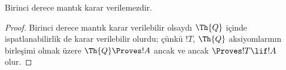 \documentclass[../../../include/open-logic-section]{subfiles}
\begin{document}
\begin{cor}
Birinci derece mantık karar verilemezdir.
\end{cor}

\begin{proof}
Birinci derece mantık karar verilebilir olsaydı $\Th{Q}$ içinde
ispatlanabilirlik de karar verilebilir olurdu; çünkü $!T$, $\Th{Q}$
aksiyomlarının birleşimi olmak üzere $\Th{Q} \Proves !A$ ancak ve ancak
$\Proves !T \lif !A$ olur.
\end{proof}
\end{document}
